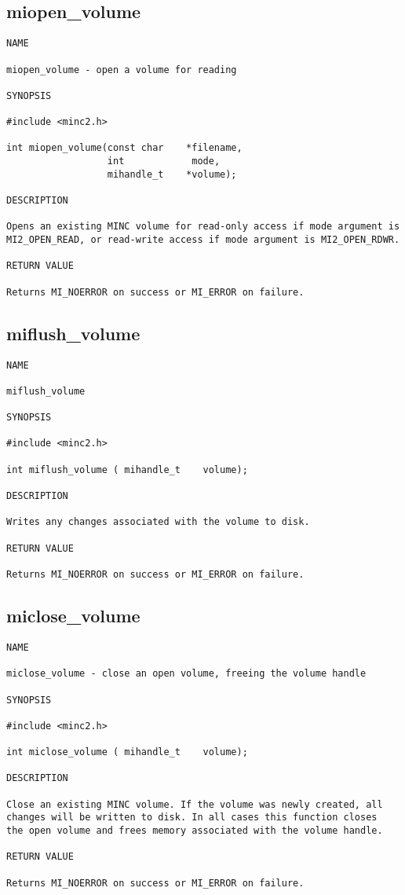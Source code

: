 \documentclass{article}
\begin{document}
\subsection{miopen\_volume}
\begin{verbatim}
NAME

miopen_volume - open a volume for reading

SYNOPSIS

#include <minc2.h>

int miopen_volume(const char    *filename, 
                  int            mode,
                  mihandle_t    *volume);

DESCRIPTION

Opens an existing MINC volume for read-only access if mode argument is
MI2_OPEN_READ, or read-write access if mode argument is MI2_OPEN_RDWR.

RETURN VALUE

Returns MI_NOERROR on success or MI_ERROR on failure.
\end{verbatim}

\subsection{miflush\_volume}
\begin{verbatim}
NAME

miflush_volume 

SYNOPSIS

#include <minc2.h>

int miflush_volume ( mihandle_t    volume);

DESCRIPTION

Writes any changes associated with the volume to disk.

RETURN VALUE

Returns MI_NOERROR on success or MI_ERROR on failure.
\end{verbatim}

\subsection{miclose\_volume}
\begin{verbatim}
NAME

miclose_volume - close an open volume, freeing the volume handle

SYNOPSIS

#include <minc2.h>

int miclose_volume ( mihandle_t    volume);

DESCRIPTION

Close an existing MINC volume. If the volume was newly created, all
changes will be written to disk. In all cases this function closes
the open volume and frees memory associated with the volume handle.

RETURN VALUE

Returns MI_NOERROR on success or MI_ERROR on failure.
\end{verbatim}
\end{document}
